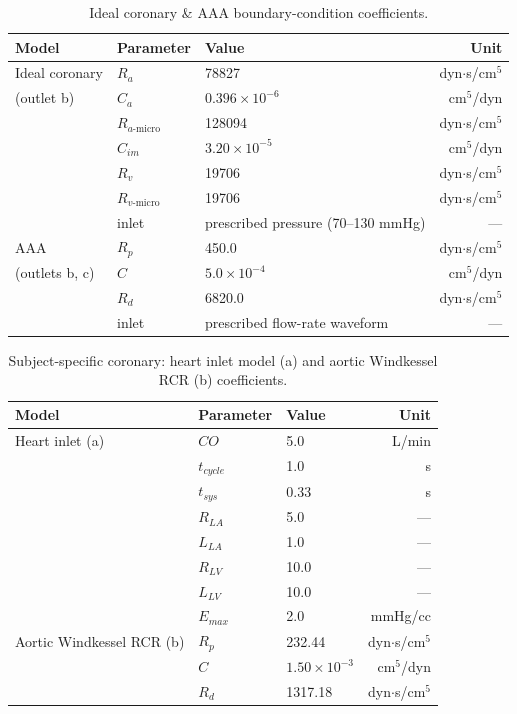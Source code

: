 \documentclass[master,english,final]{kaist-ucs}
\begin{document}
\begin{table}[ht]
\caption[Ideal coronary and AAA boundary conditions]{Ideal coronary \& AAA boundary-condition coefficients.}
\label{tab:bc-ideal-aaa}
\begin{center}
\begin{tabular}{lllr}
\hline\hline
Model & Parameter & Value & Unit \\
\hline
Ideal coronary & $R_a$ & 78827 & dyn$\cdot$s/cm$^5$ \\
(outlet b) & $C_a$ & $0.396\times10^{-6}$ & cm$^5$/dyn \\
& $R_{a\text{-micro}}$ & 128094 & dyn$\cdot$s/cm$^5$ \\
& $C_{im}$ & $3.20\times10^{-5}$ & cm$^5$/dyn \\
& $R_v$ & 19706 & dyn$\cdot$s/cm$^5$ \\
& $R_{v\text{-micro}}$ & 19706 & dyn$\cdot$s/cm$^5$ \\
& inlet & prescribed pressure (70--130 mmHg) & --- \\
AAA & $R_p$ & 450.0 & dyn$\cdot$s/cm$^5$ \\
(outlets b, c) & $C$ & $5.0\times10^{-4}$ & cm$^5$/dyn \\
& $R_d$ & 6820.0 & dyn$\cdot$s/cm$^5$ \\
& inlet & prescribed flow-rate waveform & --- \\
\hline\hline
\end{tabular}
\end{center}
\end{table}

\begin{table}[ht]
\caption[Subject-specific coronary inlet and aortic outlet BC]{Subject-specific coronary: heart inlet model (a) and aortic Windkessel RCR (b) coefficients.}
\label{tab:bc-heart-aorta}
\begin{center}
\begin{tabular}{lllr}
\hline\hline
Model & Parameter & Value & Unit \\
\hline
Heart inlet (a) & $CO$        & 5.0    & L/min \\
                & $t_{cycle}$ & 1.0    & s \\
                & $t_{sys}$   & 0.33   & s \\
                & $R_{LA}$    & 5.0    & --- \\
                & $L_{LA}$    & 1.0    & --- \\
                & $R_{LV}$    & 10.0   & --- \\
                & $L_{LV}$    & 10.0   & --- \\
                & $E_{max}$   & 2.0    & mmHg/cc \\
Aortic Windkessel RCR (b) & $R_p$ & 232.44              & dyn$\cdot$s/cm$^5$ \\
                          & $C$   & $1.50\times10^{-3}$ & cm$^5$/dyn \\
                          & $R_d$ & 1317.18             & dyn$\cdot$s/cm$^5$ \\
\hline\hline
\end{tabular}
\end{center}
\end{table}
\end{document}
